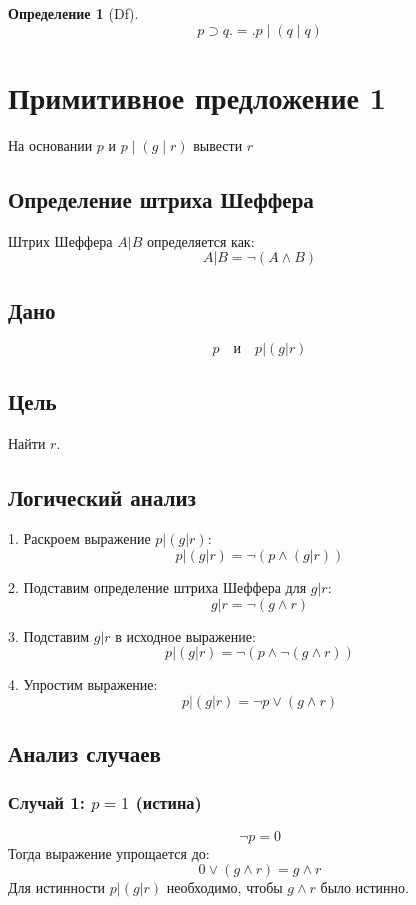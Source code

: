 \documentclass[a4paper, 12pt]{article}
\newtheorem{definition}{Определение}
\begin{document}
\begin{definition}[Df]
    \[
       p \supset q .=. p \mid (q \mid q) 
    \]
\end{definition}

\section{Примитивное предложение 1}
На основании $p$ и $p \mid ( g \mid r)$ вывести $r$

\subsection*{Определение штриха Шеффера}
Штрих Шеффера \( A | B \) определяется как:
\[
A | B = \neg (A \land B)
\]

\subsection*{Дано}
\[
p \quad \text{и} \quad p | (g | r)
\]

\subsection*{Цель}
Найти \( r \).

\subsection*{Логический анализ}

1. Раскроем выражение \( p | (g | r) \):
\[
p | (g | r) = \neg (p \land (g | r))
\]

2. Подставим определение штриха Шеффера для \( g | r \):
\[
g | r = \neg (g \land r)
\]

3. Подставим \( g | r \) в исходное выражение:
\[
p | (g | r) = \neg (p \land \neg (g \land r))
\]

4. Упростим выражение:
\[
p | (g | r) = \neg p \lor (g \land r)
\]

\subsection*{Анализ случаев}

\subsubsection*{Случай 1: \( p = 1 \) (истина)}
\[
\neg p = 0
\]
Тогда выражение упрощается до:
\[
0 \lor (g \land r) = g \land r
\]
Для истинности \( p | (g | r) \) необходимо, чтобы \( g \land r \) было истинно.
\end{document}
